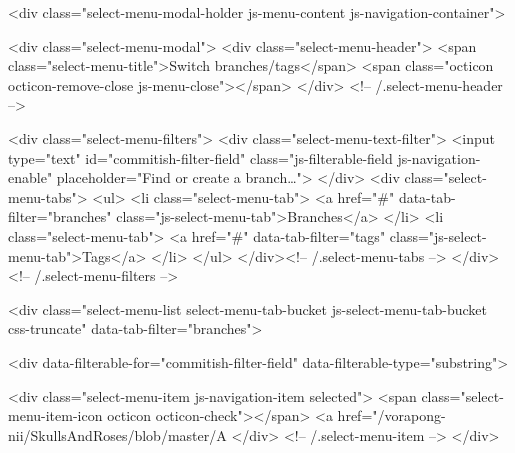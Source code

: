       <div class="select-menu-modal-holder js-menu-content js-navigation-container">

        <div class="select-menu-modal">
          <div class="select-menu-header">
            <span class="select-menu-title">Switch branches/tags</span>
            <span class="octicon octicon-remove-close js-menu-close"></span>
          </div> <!-- /.select-menu-header -->

          <div class="select-menu-filters">
            <div class="select-menu-text-filter">
              <input type="text" id="commitish-filter-field" class="js-filterable-field js-navigation-enable" placeholder="Find or create a branch…">
            </div>
            <div class="select-menu-tabs">
              <ul>
                <li class="select-menu-tab">
                  <a href="#" data-tab-filter="branches" class="js-select-menu-tab">Branches</a>
                </li>
                <li class="select-menu-tab">
                  <a href="#" data-tab-filter="tags" class="js-select-menu-tab">Tags</a>
                </li>
              </ul>
            </div><!-- /.select-menu-tabs -->
          </div><!-- /.select-menu-filters -->

          <div class="select-menu-list select-menu-tab-bucket js-select-menu-tab-bucket css-truncate" data-tab-filter="branches">

            <div data-filterable-for="commitish-filter-field" data-filterable-type="substring">

                <div class="select-menu-item js-navigation-item selected">
                  <span class="select-menu-item-icon octicon octicon-check"></span>
                  <a href="/vorapong-nii/SkullsAndRoses/blob/master/A%
                </div> <!-- /.select-menu-item -->
            </div>

